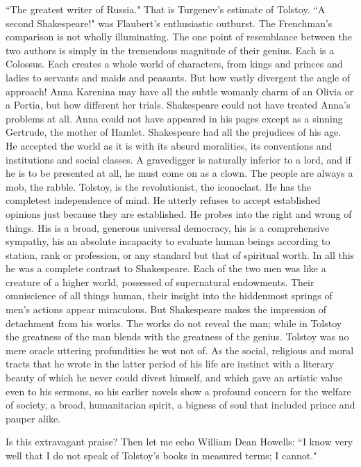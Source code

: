 ``The greatest writer of Russia." That is Turgenev's estimate of
Tolstoy. ``A second Shakespeare!" was Flaubert's enthusiastic outburst.
The Frenchman's comparison is not wholly illuminating. The one point
of resemblance between the two authors is simply in the tremendous
magnitude of their genius. Each is a Colossus. Each creates a whole
world of characters, from kings and princes and ladies to servants and
maids and peasants. But how vastly divergent the angle of approach!
Anna Karenina may have all the subtle womanly charm of an Olivia or a
Portia, but how different her trials. Shakespeare could not have
treated Anna's problems at all. Anna could not have appeared in his
pages except as a sinning Gertrude, the mother of Hamlet. Shakespeare
had all the prejudices of his age. He accepted the world as it is with
its absurd moralities, its conventions and institutions and social
classes. A gravedigger is naturally inferior to a lord, and if he is
to be presented at all, he must come on as a clown. The people are
always a mob, the rabble. Tolstoy, is the revolutionist, the
iconoclast. He has the completest independence of mind. He utterly
refuses to accept established opinions just because they are
established. He probes into the right and wrong of things. His is a
broad, generous universal democracy, his is a comprehensive sympathy,
his an absolute incapacity to evaluate human beings according to
station, rank or profession, or any standard but that of spiritual
worth. In all this he was a complete contrast to Shakespeare. Each of
the two men was like a creature of a higher world, possessed of
supernatural endowments. Their omniscience of all things human, their
insight into the hiddenmost springs of men's actions appear
miraculous. But Shakespeare makes the impression of detachment from
his works. The works do not reveal the man; while in Tolstoy the
greatness of the man blends with the greatness of the genius. Tolstoy
was no mere oracle uttering profundities he wot not of. As the social,
religious and moral tracts that he wrote in the latter period of his
life are instinct with a literary beauty of which he never could
divest himself, and which gave an artistic value even to his sermons,
so his earlier novels show a profound concern for the welfare of
society, a broad, humanitarian spirit, a bigness of soul that included
prince and pauper alike.

Is this extravagant praise? Then let me echo William Dean Howells: ``I
know very well that I do not speak of Tolstoy's books in measured
terms; I cannot."

